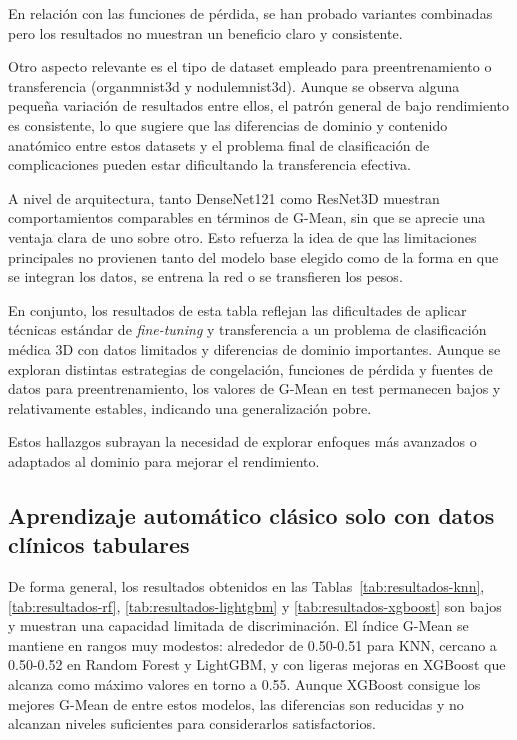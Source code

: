 En relación con las funciones de pérdida, se han probado variantes combinadas pero los resultados no muestran un beneficio claro y consistente.

Otro aspecto relevante es el tipo de dataset empleado para preentrenamiento o transferencia (organmnist3d y nodulemnist3d). Aunque se observa alguna pequeña variación de resultados entre ellos, el patrón general de bajo rendimiento es consistente, lo que sugiere que las diferencias de dominio y contenido anatómico entre estos datasets y el problema final de clasificación de complicaciones pueden estar dificultando la transferencia efectiva.

A nivel de arquitectura, tanto DenseNet121 como ResNet3D muestran comportamientos comparables en términos de G-Mean, sin que se aprecie una ventaja clara de uno sobre otro. Esto refuerza la idea de que las limitaciones principales no provienen tanto del modelo base elegido como de la forma en que se integran los datos, se entrena la red o se transfieren los pesos.

En conjunto, los resultados de esta tabla reflejan las dificultades de aplicar técnicas estándar de \textit{fine-tuning} y transferencia a un problema de clasificación médica 3D con datos limitados y diferencias de dominio importantes. Aunque se exploran distintas estrategias de congelación, funciones de pérdida y fuentes de datos para preentrenamiento, los valores de G-Mean en test permanecen bajos y relativamente estables, indicando una generalización pobre.

Estos hallazgos subrayan la necesidad de explorar enfoques más avanzados o adaptados al dominio para mejorar el rendimiento. 

\subsection{Aprendizaje automático clásico solo con datos clínicos tabulares}

De forma general, los resultados obtenidos en las Tablas~\ref{tab:resultados-knn}, \ref{tab:resultados-rf}, \ref{tab:resultados-lightgbm} y \ref{tab:resultados-xgboost} son bajos y muestran una capacidad limitada de discriminación. El índice G-Mean se mantiene en rangos muy modestos: alrededor de 0.50-0.51 para KNN, cercano a 0.50-0.52 en Random Forest y LightGBM, y con ligeras mejoras en XGBoost que alcanza como máximo valores en torno a 0.55. Aunque XGBoost consigue los mejores G-Mean de entre estos modelos, las diferencias son reducidas y no alcanzan niveles suficientes para considerarlos satisfactorios.  

